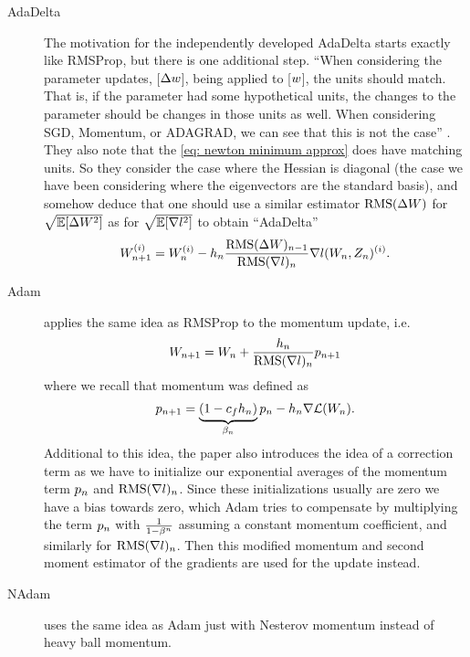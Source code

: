 \begin{description}
	\item[AdaDelta] \parencite{zeilerADADELTAAdaptiveLearning2012} The motivation
	for the independently developed AdaDelta starts exactly like RMSProp, but
	there is one additional step.
	``When considering the parameter updates, [\(\Delta w\)], being applied to
	[\(w\)], the units should match. That is, if the parameter had some
	hypothetical units, the changes to the parameter should be changes in those
	units as well. When considering SGD, Momentum, or ADAGRAD, we can see that
	this is not the case'' \parencite[p. 3]{zeilerADADELTAAdaptiveLearning2012}.
	They also note that the \ref{eq: newton minimum approx} does have matching
	units. So they consider the case where the Hessian is diagonal (the case we
	have been considering where the eigenvectors are the standard basis), and
	somehow deduce that one should use a similar estimator
	\(\text{RMS}(\Delta W)\) for \(\sqrt{\mathbb{E}[\Delta W^2]}\) as for
	\(\sqrt{\mathbb{E}[\nabla l^2]}\) to obtain ``AdaDelta''
	\begin{align*}
		W_{n+1}^{(i)} = W_n^{(i)}
		-h_n\frac{\text{RMS}(\Delta W)_{n-1}}{\text{RMS}(\nabla l)_n}
		\nabla l(W_n, Z_n)^{(i)}.
	\end{align*}

	\item[Adam] \parencite{kingmaAdamMethodStochastic2017} applies the same idea
	as RMSProp to the momentum update, i.e.
	\begin{align*}
		W_{n+1} = W_n + \frac{h_n}{\text{RMS}(\nabla l)_n} p_{n+1}
	\end{align*}
	where we recall that momentum was defined as
	\begin{align*}
		p_{n+1} = \underbrace{(1-c_f h_n)}_{\beta_n} p_n - h_n\nabla\mathcal{L}(W_n).
	\end{align*}
	Additional to this idea, the paper also introduces the idea of a correction term
	as we have to initialize our exponential averages of the momentum term \(p_n\)
	and \(\text{RMS}(\nabla l)_n\). Since these initializations usually are zero
	we have a bias towards zero, which Adam tries to compensate by multiplying
	the term \(p_n\) with \(\frac{1}{1-\beta^n}\) assuming a constant
	momentum coefficient, and similarly for \(\text{RMS}(\nabla l)_n\). Then
	this modified momentum and second moment estimator of the gradients are
	used for the update instead.


	\item[NAdam] \parencite{dozatIncorporatingNesterovMomentum2016}
	uses the same idea as Adam just with Nesterov momentum instead of heavy ball
	momentum.


\end{description}
